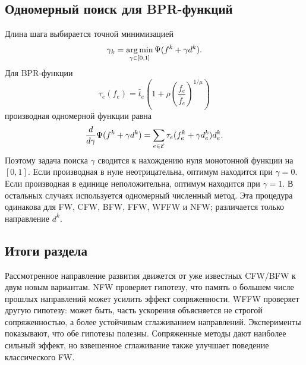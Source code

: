 \subsection{Одномерный поиск для BPR-функций}

Длина шага выбирается точной минимизацией
\[
    \gamma_k=\operatorname*{arg\,min}_{\gamma\in[0,1]}\Psi(f^k+\gamma d^k).
\]
Для BPR-функции
\[
    \tau_e(f_e)=\bar t_e\left(1+\rho\left(\frac{f_e}{\bar f_e}\right)^{1/\mu}\right)
\]
производная одномерной функции равна
\[
    \frac{d}{d\gamma}\Psi(f^k+\gamma d^k)
    =
    \sum_{e\in\mathcal{E}}
    \tau_e(f_e^k+\gamma d_e^k)d_e^k.
\]
Поэтому задача поиска $\gamma$ сводится к нахождению нуля монотонной функции на $[0,1]$.
Если производная в нуле неотрицательна, оптимум находится при $\gamma=0$.
Если производная в единице неположительна, оптимум находится при $\gamma=1$.
В остальных случаях используется одномерный численный метод.
Эта процедура одинакова для FW, CFW, BFW, FFW, WFFW и NFW; различается только направление
$d^k$.

\subsection{Итоги раздела}

Рассмотренное направление развития движется от уже известных CFW/BFW к двум новым вариантам.
NFW проверяет гипотезу, что память о большем числе прошлых направлений может усилить
эффект сопряженности.
WFFW проверяет другую гипотезу: может быть, часть ускорения объясняется не строгой
сопряженностью, а более устойчивым сглаживанием направлений.
Эксперименты показывают, что обе гипотезы полезны.
Сопряженные методы дают наиболее сильный эффект, но взвешенное сглаживание также улучшает
поведение классического FW.
